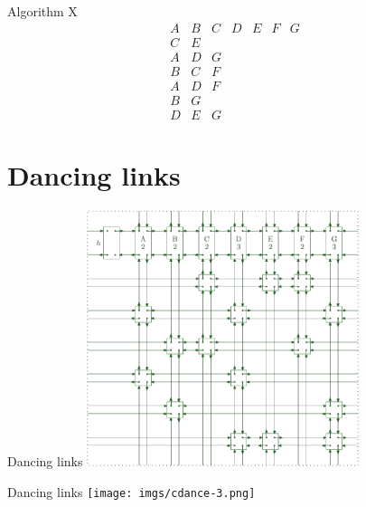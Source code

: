 \documentclass[xcolor=svgnames]{beamer}
\begin{document}
%
\begin{frame}{Algorithm X}
\Large\boldmath
  $$
  \begin{array}{ccccccc}
    A & B & C & D & E & F & G\\
    \hline
    C & E &&&&&\\
    A & D & G &&&&\\
    B & C & F &&&&\\
    A & D & F &&&&\\
    B & G &&&&&\\
    D & E & G &&&&
  \end{array}
  $$
\end{frame}


\section{Dancing links}

%
\begin{frame}{Dancing links}
  \centering\includegraphics[height=7.5cm]{imgs/cdance-2.png}
\end{frame}

%
\begin{frame}{Dancing links}
  \centering\texttt{[image: imgs/cdance-3.png]}
\end{frame}
\end{document}
